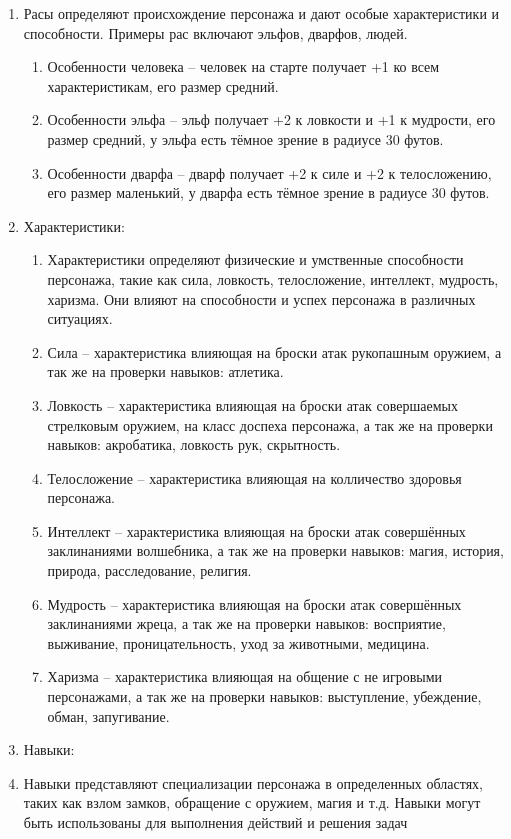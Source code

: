 \begin{enumerate}
		\item Расы определяют происхождение персонажа и дают особые характеристики и способности. Примеры рас включают эльфов, дварфов, людей.
			\begin{enumerate}
			\item Особенности человека -- человек на старте получает +1 ко всем характеристикам, его размер средний.
			\item Особенности эльфа -- эльф получает +2 к ловкости и +1 к мудрости, его размер средний, у эльфа есть тёмное зрение в радиусе 30 футов.
			\item Особенности дварфа -- дварф получает +2 к силе и +2 к телосложению, его размер маленький, у дварфа есть тёмное зрение в радиусе 30 футов.
			\end{enumerate}
		\item Характеристики:
		\begin{enumerate}
			\item Характеристики определяют физические и умственные способности персонажа, такие как сила, ловкость, телосложение, интеллект, мудрость, харизма. Они влияют на способности и успех персонажа в различных ситуациях.
			\item Сила -- характеристика влияющая на броски атак рукопашным оружием, а так же на проверки навыков: атлетика.
			\item Ловкость -- характеристика влияющая на броски атак совершаемых стрелковым оружием, на класс доспеха персонажа, а так же на проверки навыков: акробатика, ловкость рук, скрытность.
			\item Телосложение -- характеристика влияющая на колличество здоровья персонажа.
			\item Интеллект -- характеристика влияющая на броски атак совершённых заклинаниями волшебника, а так же на проверки навыков: магия, история, природа, расследование, религия.
			\item Мудрость -- характеристика влияющая на броски атак  совершённых заклинаниями жреца, а так же на проверки навыков: восприятие, выживание, проницательность, уход за животными, медицина.
			\item Харизма -- характеристика влияющая на общение с не игровыми персонажами, а так же на проверки навыков: выступление, убеждение, обман, запугивание.
		\end{enumerate}
		\item Навыки:
			\item Навыки представляют специализации персонажа в определенных областях, таких как взлом замков, обращение с оружием, магия и т.д. Навыки могут быть использованы для выполнения действий и решения задач

\end{enumerate}
